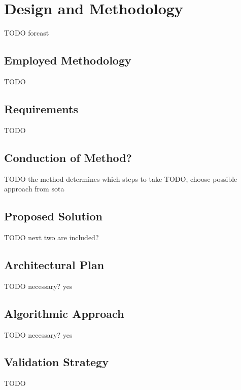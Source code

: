 \chapter{Design and Methodology}
\label{chap:design}
TODO forcast

\section{Employed Methodology}
TODO

\section{Requirements}
TODO

\section{Conduction of Method?}
TODO the method determines which steps to take
TODO, choose possible approach from sota

\section{Proposed Solution}
TODO next two are included?

\section{Architectural Plan}
TODO necessary? yes

\section{Algorithmic Approach}
TODO necessary? yes

\section{Validation Strategy}

TODO